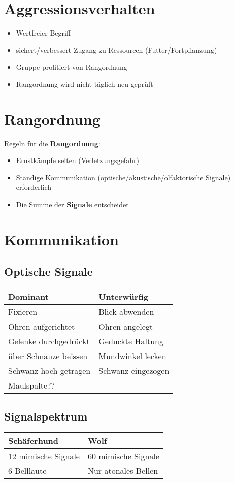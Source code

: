 \section{Aggressionsverhalten}
\begin{itemize}
    \item Wertfreier Begriff
    \item sichert/verbessert Zugang zu Ressourcen (Futter/Fortpflanzung)
    \item Gruppe profitiert von Rangordnung
    \item Rangordnung wird nicht täglich neu geprüft
\end{itemize}


\section{Rangordnung}
Regeln für die \textbf{Rangordnung}:
\begin{itemize}
    \item Ernstkämpfe selten (Verletzungsgefahr)
    \item Ständige Kommunikation (optische/akustische/olfaktorische Signale) erforderlich
    \item Die Summe der \textbf{Signale} entscheidet
\end{itemize}


\section{Kommunikation}

    \subsection{Optische Signale}
    \begin{tabular}{l|l}
        \textbf{Dominant} & \textbf{Unterwürfig} \\
        \hline
        Fixieren & Blick abwenden \\
        Ohren aufgerichtet & Ohren angelegt \\
        Gelenke durchgedrückt & Geduckte Haltung \\
        über Schnauze beissen & Mundwinkel lecken \\
        Schwanz hoch getragen & Schwanz eingezogen \\
        Maulspalte?? \\
    \end{tabular}

    \subsection{Signalspektrum}
        \begin{tabular}{l|l}
            \textbf{Schäferhund} & \textbf{Wolf} \\
            \hline
            12 mimische Signale & 60 mimische Signale \\
            6 Belllaute & Nur atonales Bellen \\
        \end{tabular}

